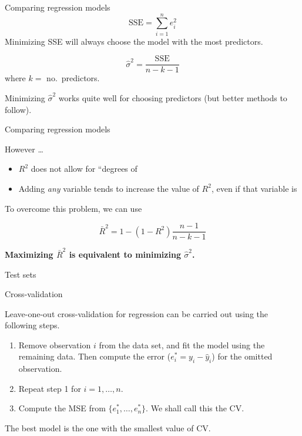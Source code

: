 \documentclass[14pt]{beamer}
\makeatletter
\def\biz{\begin{itemize}[<+-| alert@+>]}
\def\eiz{\end{itemize}}
\def\ben{\begin{enumerate}[<+-| alert@+>]}
\def\een{\end{enumerate}}
\makeatother
\begin{document}
\begin{frame}{Comparing regression models}
\[\text{SSE} = \sum_{i=1}^n e_i^2 \]
Minimizing SSE will always choose the model with the most predictors.

\pause
{}
\[
\hat{\sigma}^2 = \frac{\text{SSE}}{n-k-1}
\]
where $k=$ no.\ predictors.\pause

Minimizing $\hat{\sigma}^2$ works quite well for choosing predictors (but better methods to follow).

\end{frame}


\begin{frame}{Comparing regression models}

However \dots
\biz
\item $R^2$  does not allow for ``degrees of 

\item Adding \textit{any} variable tends to increase the value of $R^2$, even if that variable is
\eiz\pause

To overcome   this problem, we can use 
\begin{block}{}
\[
\bar{R}^2 = 1-(1-R^2)\frac{n-1}{n-k-1}
\]
\end{block}
\pause

\centerline{\textcolor[rgb]{0.8,0.00,0.00}{\textbf{Maximizing $\bar{R}^2$ is equivalent to minimizing $\hat\sigma^2$.}}}

\end{frame}


\begin{frame}{Test sets}


\end{frame}

\begin{frame}{Cross-validation}

Leave-one-out cross-validation for regression can be carried out using the following steps.
\ben
\item Remove observation $i$ from the data set, and fit the model using the remaining data. Then compute the error ($e_i^*=y_i-\hat{y}_i$) for the omitted observation.
\item Repeat step 1 for $i=1,\dots,n$.
\item Compute the MSE from $\{e_1^*,\dots,e_n^*\}$. We shall call this the CV.
\een\pause
The best model is the one with the smallest value of CV.
\end{frame}
\end{document}
